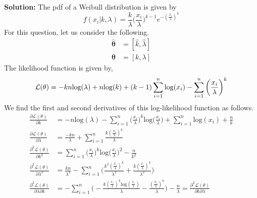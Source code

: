 \documentclass[11pt]{article}
\begin{document}
\textbf{Solution:}
The pdf of a Weibull distribution is given by
\begin{equation}
  \nonumber
  f(x_{i} | k, \lambda) = \frac{k}{\lambda}\bigg(\frac{x_{i}}{\lambda}\bigg)^{k - 1}e^{-(\frac{x_{i}}{\lambda})^{k}}
\end{equation}
For this question, let us consider the following.
\begin{equation}
  \nonumber
  \begin{aligned}
    \mathbf{\hat{\theta}} & = [\hat{k}, \hat{\lambda}]\\
    \mathbf{\theta} & = [k, \lambda]
  \end{aligned}
\end{equation}
The likelihood function is given by,
\begin{equation}
  \nonumber
  \mathcal{L}(\theta) = -kn\text{log}(\lambda) + n \text{log}(k) + (k - 1)\sum_{i = 1}^{n}\text{log}(x_{i}) - \sum_{i = 1}^{n}\bigg(\frac{x_{i}}{\lambda}\bigg)^{k}\\
\end{equation}
We find the first and second derivatives of this log-likelihood function as follows.
\begin{equation}
  \nonumber
  \begin{aligned}
    \frac{\partial \mathcal{L}(\theta)}{\partial k} & = -n \text{log}(\lambda) - \sum_{i = 1}^{n}\bigg(\frac{x_{i}}{\lambda}\bigg)^{k}\text{log}\bigg(\frac{x_{i}}{\lambda}\bigg) + \sum_{i = 1}^{n}\text{log}(x_{i}) + \frac{n}{k}\\
    \frac{\partial \mathcal{L}(\theta)}{\partial \lambda} & = \frac{-kn}{\lambda} +  \sum_{i = 1}^{n}\frac{k(\frac{x_{i}}{\lambda})^{k}}{\lambda}\\
    \frac{\partial^{2} \mathcal{L}(\theta)}{\partial k^{2}} & = \sum_{i = 1}^{n}\bigg(\frac{x_{i}}{\lambda}\bigg)^{k}\text{log}\bigg(\frac{x_{i}}{\lambda}\bigg)^{2} - \frac{n}{k^{2}}\\
    \frac{\partial^{2} \mathcal{L}(\theta)}{\partial \lambda^{2}} & = \frac{kn}{\lambda^{2}} - \sum_{i = 1}^{n}\bigg(\frac{k^2 (\frac{x_{i}}{\lambda})^{k}}{\lambda^{2}} + \frac{k(\frac{x_{i}}{\lambda})^{k}}{\lambda^{2}}\bigg)\\
    \frac{\partial^{2} \mathcal{L}(\theta)}{\partial \lambda \partial k} & = -\sum_{i = 1}^{n}\bigg(-\frac{k(\frac{x_{i}}{\lambda})^{k}\text{log}(\frac{x_{i}}{\lambda})}{\lambda} - \frac{(\frac{x_{i}}{\lambda})^{k}}{\lambda}\bigg) - \frac{n}{\lambda} = \frac{\partial^{2} \mathcal{L}(\theta)}{\partial k \partial \lambda }\\
  \end{aligned}
\end{equation}
\end{document}
